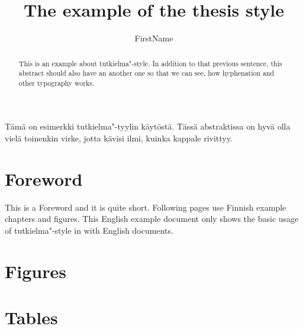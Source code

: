 \documentclass[english]{tutkielma}
\title{The example of the thesis style}
\author{FirstName}{SecondName}{LastName}
\begin{document}
\maketitle

\begin{abstract}

\noindent This is an example about tutkielma"-style.
In addition to that previous sentence, this abstract should also have
an another one so that we can see, how hyphenation and other
typography works.

\end{abstract}

\begin{foreignabstract}

\noindent Tämä on esimerkki tutkielma"-tyylin käytöstä.
Tässä abstraktissa on hyvä olla vielä toinenkin virke,
jotta kävisi ilmi, kuinka kappale rivittyy.


\end{foreignabstract}

\chapter*{Foreword}
\thispagestyle{empty}

\noindent This is a Foreword and it is quite short. Following pages use Finnish example chapters and figures. This English example document only shows the basic usage of tutkielma"-style in with English documents.

\chapter*{Figures}
\listoffigures
\thispagestyle{empty}

\begingroup
\renewcommand{\cleardoublepage}{}
\renewcommand{\clearpage}{}
\par\addvspace{26pt}

\chapter*{Tables}
\listoftables
\thispagestyle{empty}

\endgroup

\tableofcontents





\appendix


\end{document}
